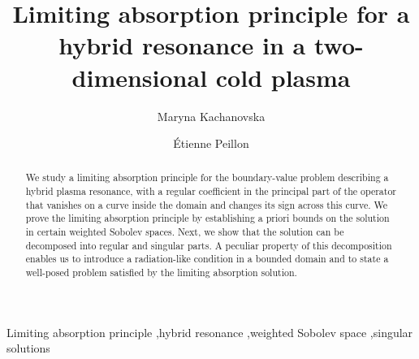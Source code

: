 \documentclass[report]{elsarticle}
\numberwithin{theorem}{section}
\begin{document}
	\begin{frontmatter}
			\title{Limiting absorption principle for a hybrid resonance in a two-dimensional cold plasma}
		\author{Maryna Kachanovska} %
	\author{\'Etienne Peillon}
	\address{{POEMS, CNRS, Inria, ENSTA, Institut Polytechnique de Paris, 91120 Palaiseau, France}}
	
		
		
		\begin{abstract}
			We study a limiting absorption principle for the boundary-value  problem describing a hybrid plasma resonance, with a regular coefficient in the principal part of the operator that vanishes on a curve inside the domain and changes its sign across this curve. We prove the limiting absorption principle by establishing a priori bounds on the solution in certain weighted Sobolev spaces. Next, we show that the solution can be decomposed into  regular and  singular parts. A peculiar property of this decomposition enables us to introduce a radiation-like condition in a bounded domain and to state a well-posed problem satisfied by the limiting absorption solution. 
		\end{abstract}
		\begin{keyword}
			Limiting absorption principle \sep hybrid resonance \sep weighted Sobolev space \sep singular solutions 
			
			
			
			
		\end{keyword}
		
	\end{frontmatter}


  
\end{document}
